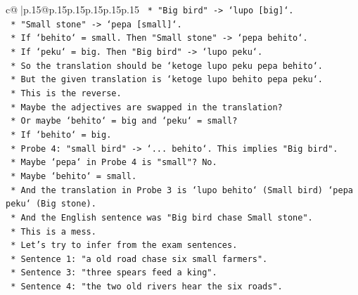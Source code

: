 \documentclass{article}
\begin{document}
{\begin{supertabular}{c@{$\;$}|p{.15\linewidth}@{}p{.15\linewidth}p{.15\linewidth}p{.15\linewidth}p{.15\linewidth}p{.15\linewidth}}
{{{\texttt{                            *   "Big bird" {-}> `lupo {[}big{]}`.} \\
\texttt{                            *   "Small stone" {-}> `pepa {[}small{]}`.} \\
\texttt{                            *   If `behito` = small. Then "Small stone" {-}> `pepa behito`.} \\
\texttt{                            *   If `peku` = big. Then "Big bird" {-}> `lupo peku`.} \\
\texttt{                            *   So the translation should be `ketoge lupo peku pepa behito`.} \\
\texttt{                            *   But the given translation is `ketoge lupo behito pepa peku`.} \\
\texttt{                            *   This is the reverse.} \\
\texttt{                            *   Maybe the adjectives are swapped in the translation?} \\
\texttt{                            *   Or maybe `behito` = big and `peku` = small?} \\
\texttt{                            *   If `behito` = big.} \\
\texttt{                            *   Probe 4: "small bird" {-}> `... behito`. This implies "Big bird".} \\
\texttt{                            *   Maybe `pepa` in Probe 4 is "small"? No.} \\
\texttt{                            *   Maybe `behito` = small.} \\
\texttt{                            *   And the translation in Probe 3 is `lupo behito` (Small bird) `pepa peku` (Big stone).} \\
\texttt{                            *   And the English sentence was "Big bird chase Small stone".} \\
\texttt{                            *   This is a mess.} \\
\texttt{                            *   Let's try to infer from the exam sentences.} \\
\texttt{                            *   Sentence 1: "a old road chase six small farmers".} \\
\texttt{                            *   Sentence 3: "three spears feed a king".} \\
\texttt{                            *   Sentence 4: "the two old rivers hear the six roads".} \\
}}}
\end{supertabular}}
\end{document}
